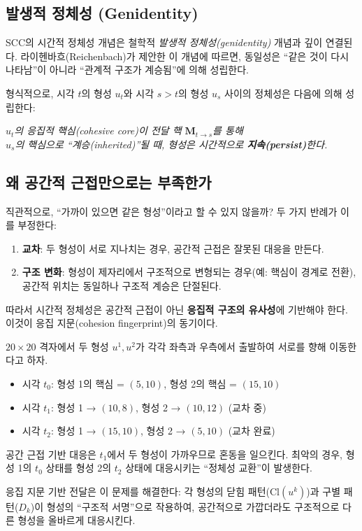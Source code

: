 \subsection{발생적 정체성 (Genidentity)}

SCC의 시간적 정체성 개념은 철학적 \emph{발생적 정체성(genidentity)} 개념과 깊이 연결된다. 라이헨바흐(Reichenbach)가 제안한 이 개념에 따르면, 동일성은 ``같은 것이 다시 나타남''이 아니라 ``관계적 구조가 계승됨''에 의해 성립한다.

형식적으로, 시각 $t$의 형성 $u_t$와 시각 $s > t$의 형성 $u_s$ 사이의 정체성은 다음에 의해 성립한다:
\begin{center}
\emph{$u_t$의 응집적 핵심(cohesive core)이 전달 핵 $\mathbf{M}_{t \to s}$를 통해\\
$u_s$의 핵심으로 ``계승(inherited)''될 때, 형성은 시간적으로 \textbf{지속(persist)}한다.}
\end{center}

\subsection{왜 공간적 근접만으로는 부족한가}

직관적으로, ``가까이 있으면 같은 형성''이라고 할 수 있지 않을까? 두 가지 반례가 이를 부정한다:

\begin{enumerate}
    \item \textbf{교차}: 두 형성이 서로 지나치는 경우, 공간적 근접은 잘못된 대응을 만든다.
    \item \textbf{구조 변화}: 형성이 제자리에서 구조적으로 변형되는 경우(예: 핵심이 경계로 전환), 공간적 위치는 동일하나 구조적 계승은 단절된다.
\end{enumerate}

따라서 시간적 정체성은 공간적 근접이 아닌 \textbf{응집적 구조의 유사성}에 기반해야 한다. 이것이 응집 지문(cohesion fingerprint)의 동기이다.

\begin{example}
\label{ex:crossing-problem}
$20 \times 20$ 격자에서 두 형성 $u^1, u^2$가 각각 좌측과 우측에서 출발하여 서로를 향해 이동한다고 하자.

\begin{itemize}
    \item 시각 $t_0$: 형성 1의 핵심 = $(5, 10)$, 형성 2의 핵심 = $(15, 10)$
    \item 시각 $t_1$: 형성 1 → $(10, 8)$, 형성 2 → $(10, 12)$ (교차 중)
    \item 시각 $t_2$: 형성 1 → $(15, 10)$, 형성 2 → $(5, 10)$ (교차 완료)
\end{itemize}

공간 근접 기반 대응은 $t_1$에서 두 형성이 가까우므로 혼동을 일으킨다. 최악의 경우, 형성 1의 $t_0$ 상태를 형성 2의 $t_2$ 상태에 대응시키는 ``정체성 교환''이 발생한다.

응집 지문 기반 전달은 이 문제를 해결한다: 각 형성의 닫힘 패턴($\mathrm{Cl}(u^k)$)과 구별 패턴($D_k$)이 형성의 ``구조적 서명''으로 작용하여, 공간적으로 가깝더라도 구조적으로 다른 형성을 올바르게 대응시킨다.
\end{example}


